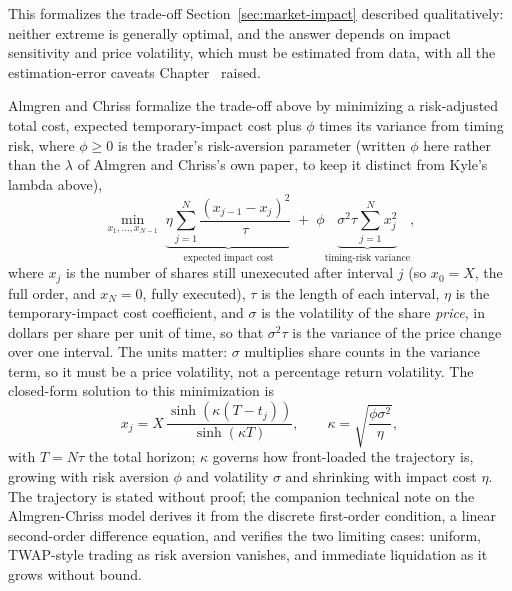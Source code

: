 \documentclass[../ai_in_finance]{subfiles}
\begin{document}
This formalizes the trade-off Section~\ref{sec:market-impact} described qualitatively: neither extreme is generally optimal, and the answer depends on impact sensitivity and price volatility, which must be estimated from data, with all the estimation-error caveats Chapter~ raised.


Almgren and Chriss formalize the trade-off above by minimizing a risk-adjusted total cost, expected temporary-impact cost plus $\phi$ times its variance from timing risk, where $\phi\ge 0$ is the trader's risk-aversion parameter (written $\phi$ here rather than the $\lambda$ of Almgren and Chriss's own paper, to keep it distinct from Kyle's lambda above),
\begin{equation}
\min_{x_1,\ldots,x_{N-1}} \; \underbrace{\eta\sum_{j=1}^N \frac{(x_{j-1}-x_j)^2}{\tau}}_{\text{expected impact cost}} \; + \; \phi\underbrace{\sigma^2\tau\sum_{j=1}^N x_j^2}_{\text{timing-risk variance}},
\label{eq:algotrading-ac-objective}
\end{equation}
where $x_j$ is the number of shares still unexecuted after interval $j$ (so $x_0=X$, the full order, and $x_N=0$, fully executed), $\tau$ is the length of each interval, $\eta$ is the temporary-impact cost coefficient, and $\sigma$ is the volatility of the share \emph{price}, in dollars per share per unit of time, so that $\sigma^2\tau$ is the variance of the price change over one interval. The units matter: $\sigma$ multiplies share counts in the variance term, so it must be a price volatility, not a percentage return volatility. The closed-form solution to this minimization is
\begin{equation}
x_j = X\,\frac{\sinh(\kappa(T-t_j))}{\sinh(\kappa T)}, \qquad \kappa=\sqrt{\frac{\phi\sigma^2}{\eta}},
\label{eq:algotrading-ac-trajectory}
\end{equation}
with $T=N\tau$ the total horizon; $\kappa$ governs how front-loaded the trajectory is, growing with risk aversion $\phi$ and volatility $\sigma$ and shrinking with impact cost $\eta$. The trajectory is stated without proof; the companion technical note on the Almgren-Chriss model derives it from the discrete first-order condition, a linear second-order difference equation, and verifies the two limiting cases: uniform, TWAP-style trading as risk aversion vanishes, and immediate liquidation as it grows without bound.
\end{document}
